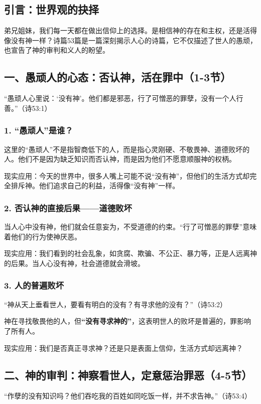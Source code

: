 \documentclass[a4paper, 12pt]{article}
\begin{document}
\subsection*{引言：世界观的抉择}
弟兄姐妹，我们每一天都在做出信仰上的选择。是相信神的存在和主权，还是活得像没有神一样？诗篇53篇是一篇深刻揭示人心的诗篇，它不仅描述了世人的愚顽，也宣告了神的审判和义人的盼望。

\subsection*{一、愚顽人的心态：否认神，活在罪中（1-3节）}
“愚顽人心里说：‘没有神’。他们都是邪恶，行了可憎恶的罪孽，没有一个人行善。”（诗53:1）

\subsubsection*{1. “愚顽人”是谁？}
\hspace{0.6cm}这里的“愚顽人”不是指智商低下的人，而是指心灵刚硬、不敬畏神、道德败坏的人。他们不是因为缺乏知识而否认神，而是因为他们不愿意顺服神的权柄。

现实应用：今天的世界中，很多人嘴上可能不说“没有神”，但他们的生活方式却完全排斥神。他们追求自己的利益，活得像“没有神”一样。
\subsubsection*{2. 否认神的直接后果——道德败坏}
\hspace{0.6cm}当人心中没有神，他们就会任意妄为，不受道德的约束。“行了可憎恶的罪孽”意味着他们的行为使神厌恶。

现实应用：我们看到的社会乱象，如贪腐、欺骗、不公正、暴力等，正是人远离神的后果。当人心没有神，社会道德就会滑坡。
\subsubsection*{3. 人的普遍败坏}
“神从天上垂看世人，要看有明白的没有？有寻求他的没有？”（诗53:2）

神在寻找敬畏他的人，但\textbf{“没有寻求神的”}，这表明世人的败坏是普遍的，罪影响了所有人。

现实应用：我们是否真正寻求神？还是只是表面上信仰，生活方式却远离神？
\subsection*{二、神的审判：神察看世人，定意惩治罪恶（4-5节）}
“作孽的没有知识吗？他们吞吃我的百姓如同吃饭一样，并不求告神。”（诗53:4）
\end{document}
